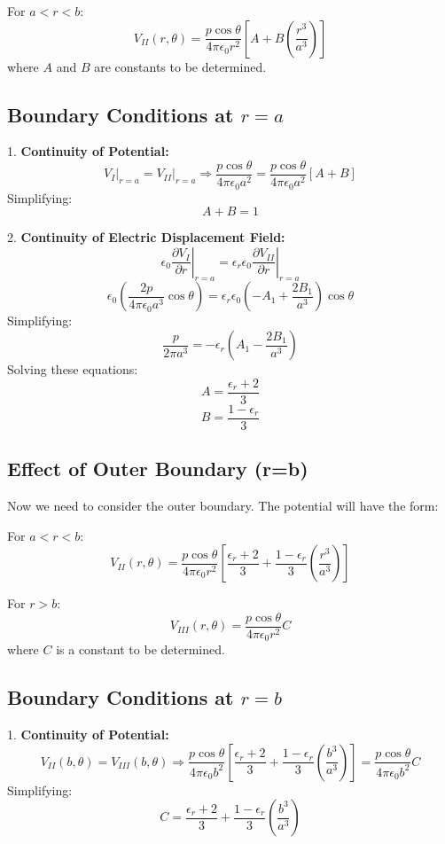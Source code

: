 \documentclass[12pt]{article}
\begin{document}
For \(a < r < b\):
\[
V_{II}(r,\theta) = \frac{p\cos\theta}{4\pi\epsilon_0r^2}\left[A + B\left(\frac{r^3}{a^3}\right)\right]
\]
where \(A\) and \(B\) are constants to be determined.

\subsection*{Boundary Conditions at \(r=a\)}

1. \textbf{Continuity of Potential:}
\[
\left.V_I\right|_{r=a} = \left.V_{II}\right|_{r=a} \Rightarrow \frac{p\cos\theta}{4\pi\epsilon_0a^2} = \frac{p\cos\theta}{4\pi\epsilon_0a^2}\left[A + B\right]
\]
Simplifying:
\[
A + B = 1
\]

2. \textbf{Continuity of Electric Displacement Field:}
\[
\epsilon_0\left.\frac{\partial V_I}{\partial r}\right|_{r=a} = \epsilon_r\epsilon_0\left.\frac{\partial V_{II}}{\partial r}\right|_{r=a}
\]
\[
\epsilon_0 \left( \frac{2p}{4\pi \epsilon_0 a^3} \cos \theta \right) = \epsilon_r \epsilon_0 \left( -A_1 + \frac{2B_1}{a^3} \right) \cos \theta
\]
Simplifying:
\[
\frac{p}{2\pi a^3} = -\epsilon_r \left( A_1 - \frac{2B_1}{a^3} \right)
\]
Solving these equations:
\[
A = \frac{\epsilon_r + 2}{3}
\]
\[
B = \frac{1-\epsilon_r}{3}
\]

\subsection*{Effect of Outer Boundary (r=b)}

Now we need to consider the outer boundary. The potential will have the form:

For \(a < r < b\):
\[
V_{II}(r,\theta) = \frac{p\cos\theta}{4\pi\epsilon_0r^2}\left[\frac{\epsilon_r + 2}{3} + \frac{1-\epsilon_r}{3}\left(\frac{r^3}{a^3}\right)\right]
\]

For \(r > b\):
\[
V_{III}(r,\theta) = \frac{p\cos\theta}{4\pi\epsilon_0r^2}C
\]
where \(C\) is a constant to be determined.

\subsection*{Boundary Conditions at \(r=b\)}

1. \textbf{Continuity of Potential:}
\[
V_{II}(b, \theta) = V_{III}(b, \theta) \Rightarrow \frac{p\cos\theta}{4\pi\epsilon_0b^2}\left[\frac{\epsilon_r + 2}{3} + \frac{1-\epsilon_r}{3}\left(\frac{b^3}{a^3}\right)\right] = \frac{p\cos\theta}{4\pi\epsilon_0b^2}C
\]
Simplifying:
\[
C = \frac{\epsilon_r + 2}{3} + \frac{1-\epsilon_r}{3}\left(\frac{b^3}{a^3}\right)
\]
\end{document}
